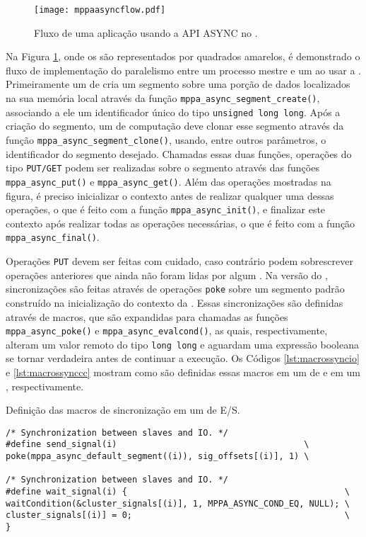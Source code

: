 \begin{figure}[tb]
  \centering
  \caption{Fluxo de uma aplicação usando a API ASYNC no \mppa.}
  \label{fig:mppaasyncflow}
  \texttt{[image: mppaasyncflow.pdf]}
\end{figure}

Na Figura \ref{fig:mppaasyncflow}, onde os \clusters são representados por quadrados amarelos, é demonstrado o fluxo de implementação do paralelismo entre um processo mestre e um \CC ao usar a \ASYNC. Primeiramente um \cluster de \IO cria um segmento sobre uma porção de dados localizados na sua memória local através da função \texttt{mppa\_async\_segment\_create()}, associando a ele um identificador único do tipo \texttt{unsigned long long}. Após a criação do segmento, um \cluster de computação deve clonar esse segmento através da função \texttt{mppa\_async\_segment\_clone()}, usando, entre outros parâmetros, o identificador do segmento desejado. Chamadas essas duas funções, operações do tipo \texttt{PUT/GET} podem ser realizadas sobre o segmento através das funções \texttt{mppa\_async\_put()} e \texttt{mppa\_async\_get()}. Além das operações mostradas na figura, é preciso inicializar o contexto antes de realizar qualquer uma dessas operações, o que é feito com a função \texttt{mppa\_async\_init()}, e finalizar este contexto após realizar todas as operações necessárias, o que é feito com a função \texttt{mppa\_async\_final()}.

Operações \texttt{PUT} devem ser feitas com cuidado, caso contrário podem sobrescrever operações anteriores que ainda não foram lidas por algum \cluster. Na versão \ASYNC do \capb, sincronizações são feitas através de operações \texttt{poke} sobre um segmento padrão construído na inicialização do contexto da \API. Essas sincronizações são definidas através de macros, que são expandidas para chamadas as funções \texttt{mppa\_async\_poke()} e \texttt{mppa\_async\_evalcond()}, as quais, respectivamente, alteram um valor remoto do tipo \texttt{long long} e aguardam uma expressão booleana se tornar verdadeira antes de continuar a execução. Os Códigos \ref{lst:macrossyncio} e \ref{lst:macrossynccc} mostram como são definidas essas macros em um \cluster de \IO e em um \CC, respectivamente.

\begin{listing}[tb]
\caption{Definição das macros de sincronização em um \cluster de E/S.}
\label{lst:macrossyncio}
\begin{verbatim}
/* Synchronization between slaves and IO. */
#define send_signal(i)                                     \
poke(mppa_async_default_segment((i)), sig_offsets[(i)], 1) \

/* Synchronization between slaves and IO. */
#define wait_signal(i) {                                           \
waitCondition(&cluster_signals[(i)], 1, MPPA_ASYNC_COND_EQ, NULL); \
cluster_signals[(i)] = 0;                                          \
}   
\end{verbatim}
\fonte{o autor.}
\end{listing}

